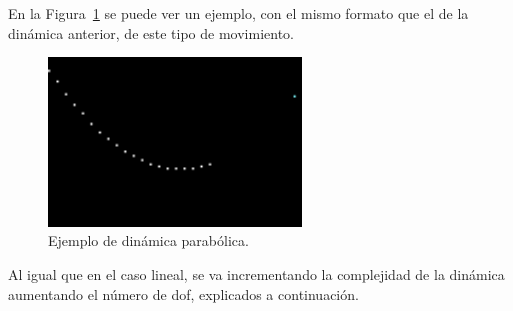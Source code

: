 En la Figura~\ref{fig.parab} se puede ver un ejemplo, con el mismo formato que el de la dinámica anterior, de este tipo de movimiento.

\begin{figure}[H]
		\begin{center}
			\includegraphics[width=0.6\textwidth]{ figures/samples/parabolic_sample.png}
			\caption{Ejemplo de dinámica parabólica.}
			\label{fig.parab}
		\end{center}
\end{figure}
\vspace{-10pt}

Al igual que en el caso lineal, se va incrementando la complejidad de la dinámica  aumentando el número de \acrshort{dof}, explicados a continuación.

